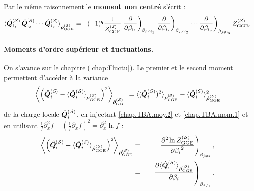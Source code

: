 Par le même raisonnement le {\bf moment non centré} s'écrit :
\begin{eqnarray}
	\braket{ \hat{\bm{Q}}_{i_1}^{(\mathcal{S})} \, \hat{\bm{Q}}_{i_2}^{(\mathcal{S})} \cdots \hat{\bm{Q}}_{i_q}^{(\mathcal{S})} }_{\hat{\bm{\rho}}^{(\mathcal{S})}_{\mathrm{GGE}}} &= &  (-1)^q \frac{1}{Z^{(\mathcal{S})}_{\mathrm{GGE}}} \left.\frac{\partial}{\partial \beta_{i_1}} \right )_{\beta_{j \neq i_1 }} \left.\frac{\partial}{\partial \beta_{i_2}} \right )_{\beta_{j \neq i_2 }} \cdots \left.\frac{\partial}{\partial \beta_{i_q}} \right )_{\beta_{j \neq i_q }} Z^{(\mathcal{S})}_{\mathrm{GGE}} \label{chap.TBA.mom.1}.	
\end{eqnarray}

\paragraph{Moments d’ordre supérieur et fluctuations.} On s'avance sur le chapitre (\ref{chap:Fluctu}).
Le premier et le second moment permettent d’accéder à la variance 
\begin{eqnarray}
	 \left \langle \left (\hat{\bm{Q}}_i^{(\mathcal{S})} - \langle\hat{\bm{Q}}_i^{(\mathcal{S})} \rangle_{\hat{\bm{\rho}}^{(\mathcal{S})}_{\mathrm{GGE}}} \right )^2  \right \rangle_{\hat{\bm{\rho}}^{(\mathcal{S})}_{\mathrm{GGE}}} = \langle(\hat{\bm{Q}}_i^{(\mathcal{S})})^2 \rangle_{\hat{\bm{\rho}}^{(\mathcal{S})}_{\mathrm{GGE}}}  -  \langle\hat{\bm{Q}}_i^{(\mathcal{S})} \rangle_{\hat{\bm{\rho}}^{(\mathcal{S})}_{\mathrm{GGE}}}^2	
\end{eqnarray}
de la charge locale $\hat{\bm{Q}}_i^{(\mathcal{S})}$, en injectant \eqref{chap.TBA.moy.2} et \eqref{chap.TBA.mom.1} et en utilisant $\frac{1}{f} \partial_x^2 f - ( \frac{1}{f} \partial_x f )^2 = \partial_x^2 \ln f $ :
\begin{eqnarray}
	\left \langle \left (\hat{\bm{Q}}_i^{(\mathcal{S})} - \langle\hat{\bm{Q}}_i^{(\mathcal{S})} \rangle_{\hat{\bm{\rho}}^{(\mathcal{S})}_{\mathrm{GGE}}} \right )^2  \right \rangle_{\hat{\bm{\rho}}^{(\mathcal{S})}_{\mathrm{GGE}}}  &=&	  \left . \frac{\partial^2 \ln Z^{(\mathcal{S})}_{\mathrm{GGE}}  }{{\partial \beta_i}^2 }  \right )_{\beta_{j\neq i}},\\
	& = &  - \left . 	\frac{\partial \langle\hat{\bm{Q}}_i^{(\mathcal{S})} \rangle_{\hat{\bm{\rho}}^{(\mathcal{S})}_{\mathrm{GGE}}} }{\partial \beta_i } \right )_{\beta_{j\neq i}}.\label{chap.TBA.mom.222}	
\end{eqnarray}

